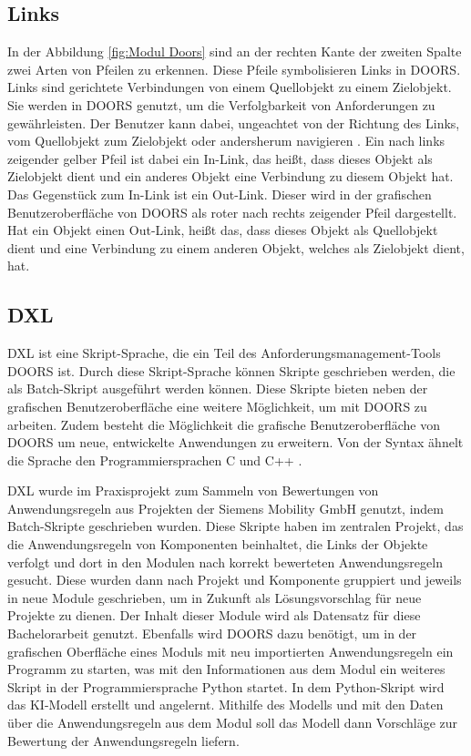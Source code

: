 \subsection{Links}
In der Abbildung \ref*{fig:Modul Doors} sind an der rechten Kante der zweiten Spalte zwei Arten von Pfeilen zu erkennen. Diese Pfeile
symbolisieren Links in \ac{DOORS}. Links sind gerichtete Verbindungen von einem Quellobjekt zu einem Zielobjekt. Sie werden in \ac{DOORS} 
genutzt, um die Verfolgbarkeit von Anforderungen zu gewährleisten. Der Benutzer kann 
dabei, ungeachtet von der Richtung des Links, vom Quellobjekt zum Zielobjekt oder andersherum navigieren \cite[vgl. S.183]{DOORS}. 
Ein nach links zeigender gelber Pfeil ist dabei ein In-Link, das heißt, dass dieses Objekt als Zielobjekt dient und ein anderes Objekt 
eine Verbindung zu diesem Objekt hat. Das Gegenstück zum In-Link ist ein Out-Link. Dieser wird in der grafischen Benutzeroberfläche von 
\ac{DOORS} als roter nach rechts zeigender Pfeil dargestellt. Hat ein Objekt einen Out-Link, heißt das, dass dieses Objekt als Quellobjekt 
dient und eine Verbindung zu einem anderen Objekt, welches als Zielobjekt dient, hat.   

\subsection{DXL}

\ac{DXL} ist eine Skript-Sprache, die ein Teil des Anforderungsmanagement-Tools \ac{DOORS} ist. Durch diese Skript-Sprache
können Skripte geschrieben werden, die als Batch-Skript ausgeführt werden können. Diese Skripte bieten neben der grafischen Benutzeroberfläche eine weitere Möglichkeit, 
um mit \ac{DOORS} zu arbeiten. Zudem besteht die Möglichkeit die grafische Benutzeroberfläche von \ac{DOORS} um neue, entwickelte Anwendungen zu
erweitern. Von der Syntax ähnelt die Sprache den Programmiersprachen C und C++ \cite[vgl. S.1]{DXL}.

\ac{DXL} wurde im Praxisprojekt zum Sammeln von Bewertungen von Anwendungsregeln aus Projekten der Siemens Mobility GmbH 
genutzt, indem Batch-Skripte geschrieben wurden. Diese Skripte haben im zentralen Projekt, das die Anwendungsregeln von Komponenten beinhaltet, die Links der Objekte
verfolgt und dort in den Modulen nach korrekt bewerteten Anwendungsregeln gesucht. Diese wurden dann nach Projekt und Komponente gruppiert und 
jeweils in neue Module geschrieben, um in Zukunft als Lösungsvorschlag für neue Projekte zu dienen. Der Inhalt dieser Module wird als Datensatz für diese Bachelorarbeit genutzt.
Ebenfalls wird \ac{DOORS} dazu benötigt, um in der grafischen Oberfläche eines Moduls mit neu importierten Anwendungsregeln ein Programm zu starten, was mit den Informationen aus dem Modul
ein weiteres Skript in der Programmiersprache Python startet. In dem Python-Skript wird das KI-Modell erstellt und angelernt. Mithilfe des Modells und mit den Daten über die Anwendungsregeln aus 
dem Modul soll das Modell dann Vorschläge zur Bewertung der Anwendungsregeln liefern.










